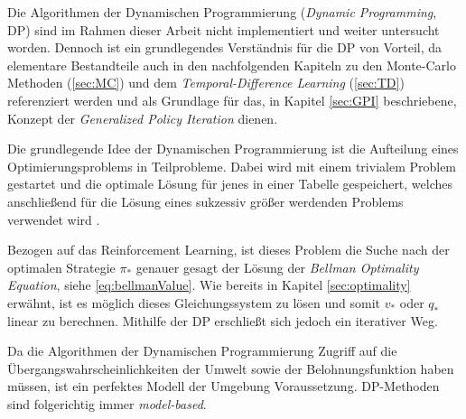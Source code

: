 Die Algorithmen der Dynamischen Programmierung (\textit{Dynamic Programming}, DP) sind im Rahmen dieser Arbeit nicht implementiert und weiter untersucht worden. Dennoch ist ein grundlegendes Verständnis für die DP von Vorteil, da elementare Bestandteile auch in den nachfolgenden Kapiteln zu den Monte-Carlo Methoden (\ref{sec:MC}) und dem \textit{Temporal-Difference Learning} (\ref{sec:TD}) referenziert werden und als Grundlage für das, in Kapitel \ref{sec:GPI} beschriebene, Konzept der \textit{Generalized Policy Iteration} dienen.
\par 
Die grundlegende Idee der Dynamischen Programmierung ist die Aufteilung eines Optimierungsproblems in Teilprobleme. Dabei wird mit einem trivialem Problem gestartet und die optimale Lösung für jenes in einer Tabelle gespeichert, welches anschließend für die Lösung eines sukzessiv größer werdenden Problems verwendet wird \cite[S.~243]{mehlhorn}.
\par 
Bezogen auf das Reinforcement Learning, ist dieses Problem die Suche nach der optimalen Strategie $\pi_*$ genauer gesagt der Lösung der \textit{Bellman Optimality Equation}, siehe \ref{eq:bellmanValue}. Wie bereits in Kapitel \ref{sec:optimality} erwähnt, ist es möglich dieses Gleichungssystem zu lösen und somit $v_*$ oder $q_*$ linear zu berechnen. Mithilfe der DP erschließt sich jedoch ein iterativer Weg.
\par 
Da die Algorithmen der Dynamischen Programmierung Zugriff auf die Übergangswahrscheinlichkeiten der Umwelt sowie der Belohnungsfunktion haben müssen, ist ein perfektes Modell der Umgebung Voraussetzung. DP-Methoden sind folgerichtig immer \textit{model-based}.
\par

